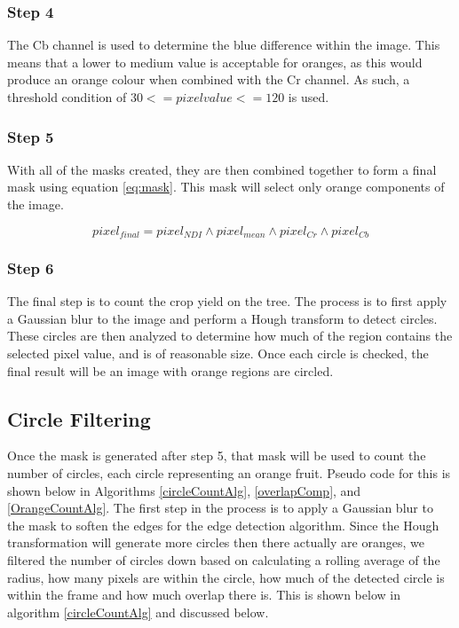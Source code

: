 \documentclass[conference]{IEEEtran}
\begin{document}
\subsubsection{Step 4}

The Cb channel is used to determine the blue difference within the image. This means that a lower to medium value is acceptable for oranges, as this would produce an orange colour when combined with the Cr channel. As such, a threshold condition of $30 <= pixelvalue <= 120$ is used.

\subsubsection{Step 5}

With all of the masks created, they are then combined together to form a final mask using equation \ref{eq:mask}. This mask will select only orange components of the image.

\begin{equation} \label{eq:mask}
pixel_{final}=pixel_{NDI} \land pixel_{mean} \land pixel_{Cr} \land pixel_{Cb} 
\end{equation}

\subsubsection{Step 6}
The final step is to count the crop yield on the tree. The process is to first apply a Gaussian blur to the image and perform a Hough transform to detect circles. These circles are then analyzed to determine how much of the region contains the selected pixel value, and is of reasonable size. Once each circle is checked, the final result will be an image with orange regions are circled.


\subsection{Circle Filtering}

Once the mask is generated after step 5, that mask will be used to count the number of circles, each circle representing an orange fruit. Pseudo code for this is shown below in Algorithms \ref{circleCountAlg}, \ref{overlapComp}, and \ref{OrangeCountAlg}. The first step in the process is to apply a Gaussian blur to the mask to soften the edges for the edge detection algorithm.  Since the Hough transformation will generate more circles then there actually are oranges, we filtered the number of circles down based on calculating a rolling average of the radius, how many pixels are within the circle, how much of the detected circle is within the frame and how much overlap there is. This is shown below in algorithm \ref{circleCountAlg} and discussed below.
\end{document}
